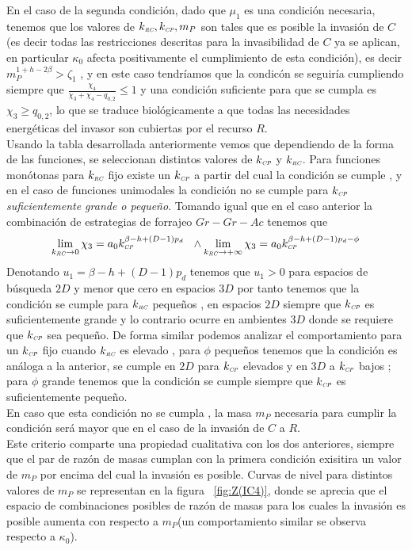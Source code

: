 En el caso de la segunda condici\'on, dado que $\mu_1$ es una condici\'on necesaria, tenemos que los valores de $k_{\textit{\tiny RC}} , k_{\textit{\tiny CP}} , m_P$ son tales que es posible la invasi\'on de $C$(es decir todas las restricciones descritas para la invasibilidad de $C$ ya se aplican, en particular $\kappa_0$ afecta positivamente el cumplimiento de esta condici\'on), es decir $m_P^{1 + h - 2\beta} > \zeta_1$ , y en este caso tendr\'iamos que la condic\'on se seguir\'ia cumpliendo siempre que $\frac{\chi_4}{\chi_3 + \chi_4 - q_{0,2}} \leq 1$ y una condici\'on suficiente para que se cumpla es $ \chi_3 \geq q_{0,2}$, lo que se traduce biol\'ogicamente a que todas las necesidades energ\'eticas del invasor son cubiertas por el recurso $R$.\\

Usando la tabla desarrollada anteriormente vemos que dependiendo de la forma de las funciones, se seleccionan distintos valores de $k_{\textit{\tiny CP}}$ y $k_{\textit{\tiny RC}}$. Para funciones mon\'otonas para $k_{\textit{\tiny RC}}$ fijo existe un $k_{\textit{\tiny CP}}$ a partir del cual la condici\'on se cumple , y en el caso de funciones unimodales la condici\'on no se cumple para $k_{\textit{\tiny CP}}$ \emph{suficientemente grande o peque\~no}. Tomando igual que en el caso anterior la combinaci\'on de estrategias de forrajeo $Gr-Gr-Ac$ tenemos que 
\begin{equation}
  \lim_{k_{\textit{\tiny RC}} \to 0} \chi_3 = a_0 k_{\textit{\tiny CP}}^{\beta - h + (D-1)p_d}  \ \ \land \lim_{k_{\textit{\tiny RC}} \to + \infty} \chi_3 = a_0 k_{\textit{\tiny CP}}^{\beta -h + (D-1)p_d - \phi} 
\end{equation}
Denotando $u_1 = \beta - h + (D-1)p_d$ tenemos que $ u_1 >0$ para espacios de b\'usqueda $2D$ y menor que cero en espacios $3D$ por tanto tenemos que la condici\'on se cumple para $k_{\textit{\tiny RC}}$ peque\~nos , en espacios $2D$ siempre que $k_{\textit{\tiny CP}}$ es suficientemente grande y lo contrario ocurre en ambientes $3D$ donde se requiere que $k_{\textit{\tiny CP}}$ sea peque\~no. De forma similar podemos analizar el comportamiento para un $k_{\textit{\tiny CP}}$ fijo cuando $k_{\textit{\tiny RC}}$ es elevado , para $\phi$ peque\~nos tenemos que la condici\'on es an\'aloga a la anterior, se cumple en $2D$ para $k_{\textit{\tiny CP}}$ elevados y en $3D$ a $k_{\textit{\tiny CP}}$ bajos ; para $\phi$ grande tenemos que la condici\'on se cumple siempre que $k_{\textit{\tiny CP}}$ es suficientemente peque\~no.\\
En caso que esta condici\'on no se cumpla , la masa $m_P$ necesaria para cumplir la condici\'on ser\'a mayor que en el caso de la invasi\'on de $C$ a $R$.\\

Este criterio comparte una propiedad cualitativa con los dos anteriores, siempre que el par de raz\'on de masas cumplan con la primera condici\'on exisitira un valor de $m_P$ por encima del cual la invasi\'on es posible. Curvas de nivel para distintos valores de $m_P$ se representan en la figura ~\ref{fig:Z(IC4)}, donde se aprecia que el espacio de combinaciones posibles de raz\'on de masas para los cuales la invasi\'on es posible aumenta con respecto a $m_P$(un comportamiento similar se observa respecto a $\kappa_0$).


